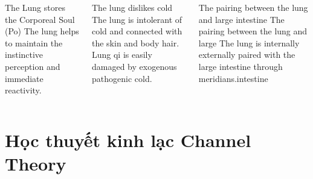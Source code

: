 \documentclass[
	11pt, %
]{beamer}
\theoremstyle{newblock}
\begin{document}
\begin{frame}
\begin{columns}
\begin{block}{The Lung stores the Corporeal Soul (Po)}
			The lung helps to maintain the instinctive perception and immediate reactivity. 
		\end{block}
		\begin{block}{The lung dislikes cold}
			The lung is intolerant of cold and connected with the skin and body hair. Lung qi is easily damaged by exogenous pathogenic cold.
		\end{block}
		\begin{block}{The pairing between the lung and large intestine}
			The pairing between the lung and large The lung is internally externally paired with the large intestine through meridians.intestine
		\end{block}
	\end{columns}
\end{frame}



\section{ Học thuyết kinh lạc \newline Channel Theory}
\end{document}
